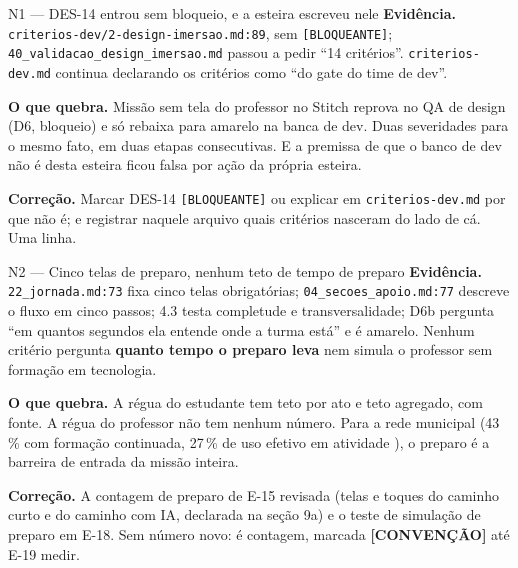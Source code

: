\documentclass[11pt,a4paper]{article}
\newcommand{\conv}{\textbf{[CONVENÇÃO]}}
\begin{document}
\begin{achadobox}{N1 --- DES-14 entrou sem bloqueio, e a esteira escreveu nele}
\textbf{Evidência.} \texttt{criterios-dev/2-design-imersao.md:89}, sem \texttt{[BLOQUEANTE]};
\texttt{40\_validacao\_design\_imersao.md} passou a pedir ``14 critérios''. \texttt{criterios-dev.md}
continua declarando os critérios como ``do gate do time de dev''.

\textbf{O que quebra.} Missão sem tela do professor no Stitch reprova no QA de design (D6, bloqueio) e
só rebaixa para amarelo na banca de dev. Duas severidades para o mesmo fato, em duas etapas
consecutivas. E a premissa de que o banco de dev não é desta esteira ficou falsa por ação da própria
esteira.

\textbf{Correção.} Marcar DES-14 \texttt{[BLOQUEANTE]} ou explicar em \texttt{criterios-dev.md} por
que não é; e registrar naquele arquivo quais critérios nasceram do lado de cá. Uma linha.
\end{achadobox}

\begin{achadobox}{N2 --- Cinco telas de preparo, nenhum teto de tempo de preparo}
\textbf{Evidência.} \texttt{22\_jornada.md:73} fixa cinco telas obrigatórias; \texttt{04\_secoes\_apoio.md:77}
descreve o fluxo em cinco passos; 4.3 testa completude e transversalidade; D6b pergunta ``em
quantos segundos ela entende onde a turma está'' e é amarelo. Nenhum critério pergunta \textbf{quanto
tempo o preparo leva} nem simula o professor sem formação em tecnologia.

\textbf{O que quebra.} A régua do estudante tem teto por ato e teto agregado, com fonte. A régua do
professor não tem nenhum número. Para a rede municipal (43\,\% com formação continuada, 27\,\% de uso
efetivo em atividade \cite{ticedu2024}), o preparo é a barreira de entrada da missão inteira.

\textbf{Correção.} A contagem de preparo de E-15 revisada (telas e toques do caminho curto e do
caminho com IA, declarada na seção 9a) e o teste de simulação de preparo em E-18. Sem número novo: é
contagem, marcada \conv{} até E-19 medir.
\end{achadobox}
\end{document}
